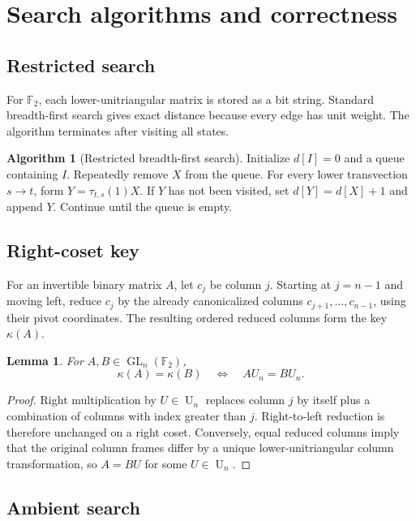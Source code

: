 \documentclass[11pt]{amsart}
\numberwithin{equation}{section}
\newtheorem{lemma}[theorem]{Lemma}
\theoremstyle{definition}
\newtheorem{algorithm}[theorem]{Algorithm}
\theoremstyle{remark}
\newcommand{\F}{\mathbb F}
\newcommand{\GL}{\operatorname{GL}}
\newcommand{\U}{\operatorname{U}}
\begin{document}
\section{Search algorithms and correctness}\label{app:algorithms}

\subsection{Restricted search}

For $\F_2$, each lower-unitriangular matrix is stored as a bit string.  Standard breadth-first search gives exact distance because every edge has unit weight.  The algorithm terminates after visiting all states.

\begin{algorithm}[Restricted breadth-first search]
Initialize $d[I]=0$ and a queue containing $I$.  Repeatedly remove $X$ from the queue.  For every lower transvection $s\to t$, form $Y=\tau_{t,s}(1)X$.  If $Y$ has not been visited, set $d[Y]=d[X]+1$ and append $Y$.  Continue until the queue is empty.
\end{algorithm}

\subsection{Right-coset key}

For an invertible binary matrix $A$, let $c_j$ be column $j$.  Starting at $j=n-1$ and moving left, reduce $c_j$ by the already canonicalized columns $c_{j+1},\ldots,c_{n-1}$, using their pivot coordinates.  The resulting ordered reduced columns form the key $\kappa(A)$.

\begin{lemma}
For $A,B\in\GL_n(\F_2)$,
\[
\kappa(A)=\kappa(B)
\quad\Longleftrightarrow\quad
AU_n=BU_n.
\]
\end{lemma}

\begin{proof}
Right multiplication by $U\in\U_n$ replaces column $j$ by itself plus a combination of columns with index greater than $j$.  Right-to-left reduction is therefore unchanged on a right coset.  Conversely, equal reduced columns imply that the original column frames differ by a unique lower-unitriangular column transformation, so $A=BU$ for some $U\in\U_n$.
\end{proof}

\subsection{Ambient search}
\end{document}
